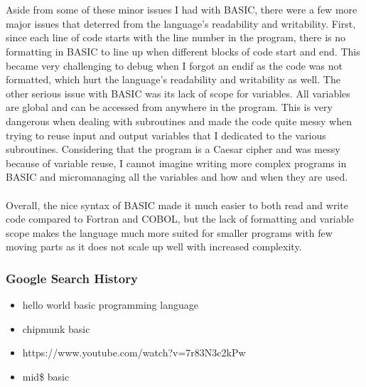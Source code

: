 \documentclass[letterpaper, 10pt, DIV=13]{scrartcl}
\numberwithin{equation}{section}
\numberwithin{figure}{section}
\numberwithin{table}{section}
\begin{document}
\\ \\
Aside from some of these minor issues I had with BASIC, there were a few more major issues that deterred from the language's readability and writability. First, since each line of code starts with the line number in the program, there is no formatting in BASIC to line up when different blocks of code start and end. This became very challenging to debug when I forgot an endif as the code was not formatted, which hurt the language's readability and writability as well. The other serious issue with BASIC was its lack of scope for variables. All variables are global and can be accessed from anywhere in the program. This is very dangerous when dealing with subroutines and made the code quite messy when trying to reuse input and output variables that I dedicated to the various subroutines. Considering that the program is a Caesar cipher and was messy because of variable reuse, I cannot imagine writing more complex programs in BASIC and micromanaging all the variables and how and when they are used.
\\ \\
Overall, the nice syntax of BASIC made it much easier to both read and write code compared to Fortran and COBOL, but the lack of formatting and variable scope makes the language much more suited for smaller programs with few moving parts as it does not scale up well with increased complexity.

\subsubsection{Google Search History}
\begin{itemize}
	\item hello world basic programming language
	\item chipmunk basic
	\item https://www.youtube.com/watch?v=7r83N3c2kPw
	\item mid\$ basic 
\end{itemize}
\end{document}
